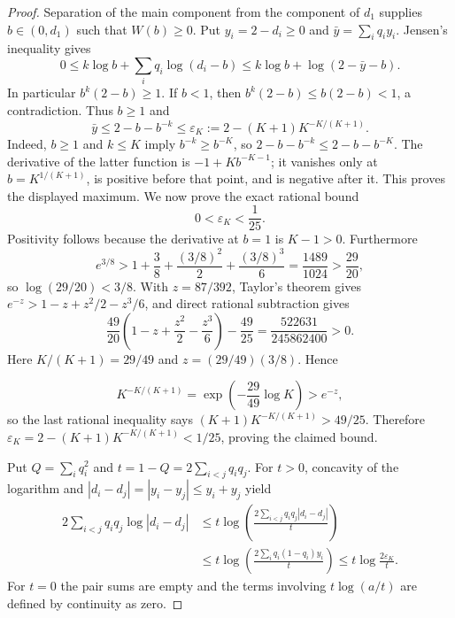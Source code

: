 \documentclass[11pt]{article}
\numberwithin{equation}{section}
\theoremstyle{plain}
\theoremstyle{definition}
\theoremstyle{remark}
\newcommand{\1}{\mathbf 1}
\newcommand{\eps}{\varepsilon}
\begin{document}
\begin{proof}
Separation of the main component from the component of $d_1$ supplies
$b\in(0,d_1)$ such that $W(b)\ge0$.  Put
$y_i=2-d_i\ge0$ and $\bar y=\sum_iq_i y_i$.  Jensen's inequality gives
\[
 0\le k\log b+\sum_iq_i\log(d_i-b)
 \le k\log b+\log(2-\bar y-b).
\]
In particular $b^k(2-b)\ge1$.  If $b<1$, then
$b^k(2-b)\le b(2-b)<1$, a contradiction.  Thus $b\ge1$ and
\[
 \bar y\le2-b-b^{-k}
 \le\eps_K:=2-(K+1)K^{-K/(K+1)}.
\]
Indeed, $b\ge1$ and $k\le K$ imply $b^{-k}\ge b^{-K}$, so
$2-b-b^{-k}\le2-b-b^{-K}$.  The derivative of the latter function is
$-1+Kb^{-K-1}$; it vanishes only at $b=K^{1/(K+1)}$, is positive before
that point, and is negative after it.  This proves the displayed maximum.
We now prove the exact rational bound
\[
 0<\eps_K<\frac1{25}.
\]
Positivity follows because the derivative at $b=1$ is $K-1>0$.
Furthermore
\[
 e^{3/8}>1+\frac38+\frac{(3/8)^2}{2}
               +\frac{(3/8)^3}{6}
 =\frac{1489}{1024}>\frac{29}{20},
\]
so $\log(29/20)<3/8$.  With $z=87/392$, Taylor's theorem gives
$e^{-z}>1-z+z^2/2-z^3/6$, and direct rational subtraction gives
\[
 \frac{49}{20}\left(1-z+\frac{z^2}{2}-\frac{z^3}{6}\right)
 -\frac{49}{25}=\frac{522631}{245862400}>0.
\]
Here $K/(K+1)=29/49$ and
$z=(29/49)(3/8)$.  Hence

\[
 K^{-K/(K+1)}
 =\exp\left(-\frac{29}{49}\log K\right)>e^{-z},
\]
so the last rational inequality says
$(K+1)K^{-K/(K+1)}>49/25$.  Therefore
$\eps_K=2-(K+1)K^{-K/(K+1)}<1/25$, proving the claimed bound.

Put $Q=\sum_iq_i^2$ and $t=1-Q=2\sum_{i<j}q_iq_j$.  For $t>0$,
concavity of the logarithm and $|d_i-d_j|=|y_i-y_j|\le y_i+y_j$ yield
\begin{align*}
2\sum_{i<j}q_iq_j\log|d_i-d_j|
&\le t\log\left(\frac{2\sum_{i<j}q_iq_j|d_i-d_j|}{t}\right)\\
&\le t\log\left(\frac{2\sum_iq_i(1-q_i)y_i}{t}\right)
 \le t\log\frac{2\eps_K}{t}.
\end{align*}
For $t=0$ the pair sums are empty and the terms involving
$t\log(a/t)$ are defined by continuity as zero.


\end{proof}
\end{document}
